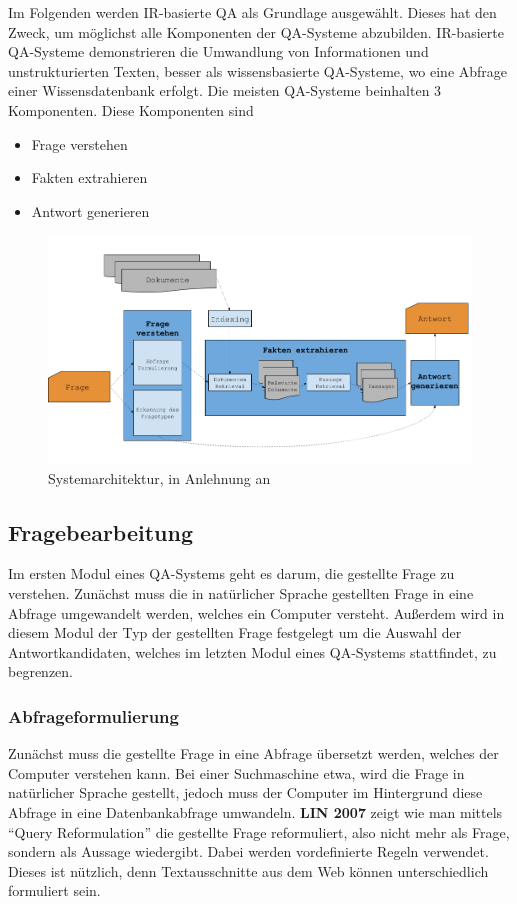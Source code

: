 \documentclass[
        ngerman,
        paper=a4,
        numbers=noendperiod,
]{scrreprt}
\begin{document}
Im Folgenden werden IR-basierte QA als Grundlage ausgewählt. Dieses hat den Zweck, um möglichst alle Komponenten der QA-Systeme abzubilden. IR-basierte QA-Systeme demonstrieren die Umwandlung von Informationen und unstrukturierten Texten, besser als wissensbasierte QA-Systeme, wo eine Abfrage einer Wissensdatenbank erfolgt. Die meisten QA-Systeme beinhalten 3 Komponenten. Diese Komponenten sind 
\begin{itemize}
\item Frage verstehen
\item Fakten extrahieren 
\item Antwort generieren
\end{itemize}




\begin{figure}[H]
    \centering\includegraphics[width=1.0\linewidth]{images/image1.png}
    \caption[Systemarchitektur]{Systemarchitektur, in Anlehnung an \cite []{eff70}}
    \label{fig:diagram1}
\end{figure}





\subsection{Fragebearbeitung}

Im ersten Modul eines QA-Systems geht es darum, die gestellte Frage zu verstehen. Zunächst muss die in natürlicher Sprache gestellten Frage in eine Abfrage umgewandelt werden, welches ein Computer versteht. Außerdem wird in diesem Modul der Typ der gestellten Frage festgelegt um die Auswahl der Antwortkandidaten, welches im letzten Modul eines QA-Systems stattfindet, zu begrenzen.

\subsubsection{Abfrageformulierung}
Zunächst muss die gestellte Frage in eine Abfrage übersetzt werden, welches der Computer verstehen kann. Bei einer Suchmaschine etwa, wird die Frage in natürlicher Sprache gestellt, jedoch muss der Computer im Hintergrund diese Abfrage in eine Datenbankabfrage umwandeln. 
\textbf{LIN 2007} zeigt wie man mittels  \enquote{Query Reformulation} die gestellte Frage reformuliert, also nicht mehr als Frage, sondern als Aussage wiedergibt. Dabei werden vordefinierte Regeln verwendet. Dieses ist nützlich, denn Textausschnitte aus dem Web können unterschiedlich formuliert sein.
\end{document}
